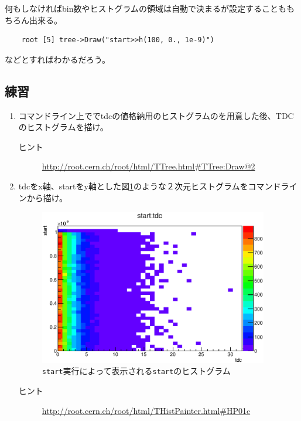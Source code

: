 何もしなければbin数やヒストグラムの領域は自動で決まるが設定することももちろん出来る。
\begin{verbatim}
	root [5] tree->Draw("start>>h(100, 0., 1e-9)")
\end{verbatim}
などとすればわかるだろう。

  \subsection{練習}
  \begin{enumerate}
   \item コマンドライン上ででtdcの値格納用のヒストグラムのを用意した後、TDCのヒストグラムを描け。
	 \begin{description}
	  \item[ヒント] \url{http://root.cern.ch/root/html/TTree.html#TTree:Draw@2}
	 \end{description}
   \item tdcをx軸、startをy軸とした図\ref{Fig:meettreecanvas3}のような２次元ヒストグラムをコマンドラインから描け。
	 \begin{figure}[htbp]
	  \begin{center}
	   \includegraphics[width = 100mm]{./picture/meettreecanvas3.eps}
	  \end{center}
	  \caption{\texttt{start}実行によって表示される\texttt{start}のヒストグラム}
	  \label{Fig:meettreecanvas3}
	 \end{figure}


	 \begin{description}
	  \item[ヒント] \url{http://root.cern.ch/root/html/THistPainter.html#HP01c}
	 \end{description}
  \end{enumerate}

